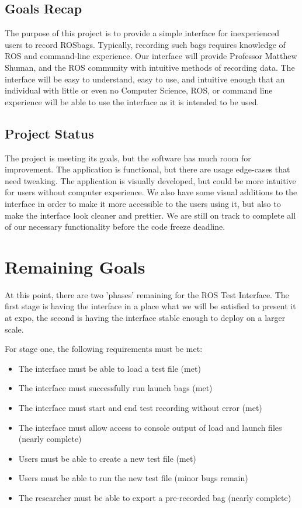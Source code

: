 \documentclass[onecolumn, draftclsnofoot,10pt, compsoc]{IEEEtran}
\begin{document}
\subsection{Goals Recap}
The purpose of this project is to provide a simple interface for inexperienced users to record ROSbags. Typically, recording such bags requires knowledge of ROS and command-line experience. Our interface will provide Professor Matthew Shuman, and the ROS community with intuitive methods of recording data. The interface will be easy to understand, easy to use, and intuitive enough that an individual with little or even no Computer Science, ROS, or command line experience will be able to use the interface as it is intended to be used.

\subsection{Project Status}
The project is meeting its goals, but the software has much room for improvement. The application is functional, but there are usage edge-cases that need tweaking. The application is visually developed, but could be more intuitive for users without computer experience. We also have some visual additions to the interface in order to make it more accessible to the users using it, but also to make the interface look cleaner and prettier. We are still on track to complete all of our necessary functionality before the code freeze deadline.

\section{Remaining Goals}
At this point, there are two 'phases' remaining for the ROS Test Interface. The first stage is having the interface in a place what we will be satisfied to present it at expo, the second is having the interface stable enough to deploy on a larger scale. 

For stage one, the following requirements must be met:
\begin{itemize}
	\item The interface must be able to load a test file (met)
	\item The interface must successfully run launch bags (met)
	\item The interface must start and end test recording without error (met)
	\item The interface must allow access to console output of load and launch files (nearly complete)
	\item Users must be able to create a new test file (met)
	\item Users must be able to run the new test file (minor bugs remain)
	\item The researcher must be able to export a pre-recorded bag (nearly complete)
\end{itemize}
\end{document}
